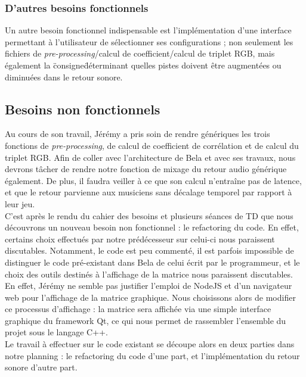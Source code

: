 \subsubsection{D'autres besoins fonctionnels}
Un autre besoin fonctionnel indispensable est l'implémentation d'une
interface permettant à l'utilisateur de sélectionner ses
configurations ; non seulement les fichiers de
\textit{pre-processing}/calcul de coefficient/calcul de triplet RGB,
mais également la \"consigne\" déterminant quelles pistes doivent être
augmentées ou diminuées dans le retour sonore. \\

\subsection{Besoins non fonctionnels}
Au cours de son travail, Jérémy a pris soin de rendre génériques les
trois fonctions de \textit{pre-processing}, de calcul de coefficient
de corrélation et de calcul du triplet RGB. Afin de coller avec
l'architecture de Bela et avec ses travaux, nous devrons tâcher de
rendre notre fonction de mixage du retour audio générique
également. De plus, il faudra veiller à ce que son calcul n'entraîne
pas de latence, et que le retour parvienne aux musiciens sans décalage
temporel par rapport à leur jeu. \\ C'est après le rendu du cahier des
besoins et plusieurs séances de TD que nous découvrons un nouveau
besoin non fonctionnel : le refactoring du code. En effet, certains
choix effectués par notre prédécesseur sur celui-ci nous paraissent
discutables. Notamment, le code est peu commenté, il est parfois
impossible de distinguer le code pré-existant dans Bela de celui écrit
par le programmeur, et le choix des outils destinés à l'affichage de
la matrice nous paraissent discutables. En effet, Jérémy ne semble pas
justifier l'emploi de NodeJS et d'un navigateur web pour l'affichage
de la matrice graphique. Nous choisissons alors de modifier ce
processus d'affichage : la matrice sera affichée via une simple
interface graphique du framework Qt, ce qui nous permet de rassembler
l'ensemble du projet sous le langage C++. \\ Le travail à effectuer
sur le code existant se découpe alors en deux parties dans notre
planning : le refactoring du code d'une part, et l'implémentation du
retour sonore d'autre part. \\
